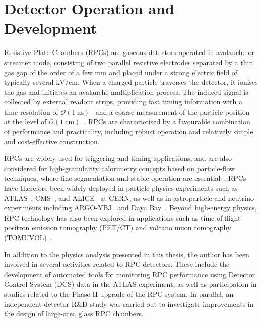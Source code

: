 ﻿\chapter{Detector Operation and Development}
\label{chap:RPC}

Resistive Plate Chambers (RPCs) are gaseous detectors operated in
avalanche or streamer mode, consisting of two parallel resistive
electrodes separated by a thin gas gap of the order of a few $\si{\milli\metre}$ and placed under a strong electric field of typically
several $\si{\kilo\volt\per\centi\metre}$. When a charged particle traverses the detector, it
ionises the gas and initiates an avalanche multiplication process.
The induced signal is collected by external readout strips,
providing fast timing information with a time resolution of
$\mathcal{O}(\SI{1}{\nano\second})$~\cite{AIELLI2004193,ARNALDI2000462,WILLIAMS2002183,BERTOLIN2009631,AIELLI200692,ZHANG2007278,ABBRESCIA2003137,AIELLI2013115}
and a coarse measurement of the particle position at the level of
$\mathcal{O}(\SI{1}{\centi\meter})$~\cite{CATTANI2012S6,ARNALDI200251}.
RPCs are characterised by a favourable combination of performance
and practicality, including robust operation and relatively simple
and cost-effective construction.

RPCs are widely used for triggering and timing applications, and are
also considered for high-granularity calorimetry concepts based on
particle-flow techniques, where fine segmentation and stable operation
are essential~\cite{PFA}. RPCs have therefore been widely deployed in
particle physics experiments such as ATLAS~\cite{Aad:2753039},
CMS~\cite{Shah_2020}, and ALICE~\cite{boss2012performance}
at CERN, as well as in astroparticle and neutrino experiments
including ARGO-YBJ~\cite{BARTOLI201547,BACCI2003110} and
Daya Bay~\cite{Ning_2013}. Beyond high-energy physics, RPC
technology has also been explored in applications such as time-of-flight
positron emission tomography (PET/CT) and volcano muon tomography
(TOMUVOL)~\cite{Crloganu2012TowardsAM}.

In addition to the physics analysis presented in this thesis,
the author has been involved in several activities related to RPC
detectors. These include the development of automated tools for
monitoring RPC performance using Detector Control System (DCS)
data in the ATLAS experiment, as well as participation in studies
related to the Phase-II upgrade of the RPC system.
In parallel, an independent detector R\&D study was carried out
to investigate improvements in the design of large-area glass RPC
chambers.

